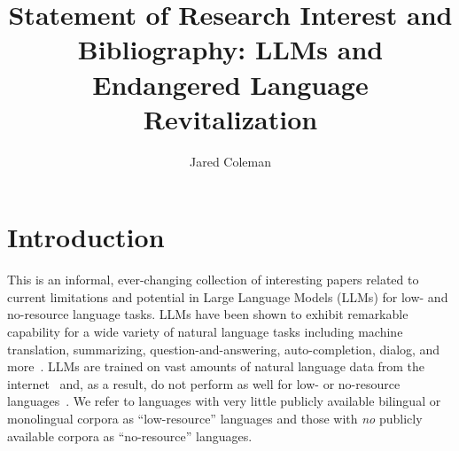 \documentclass{article}
\title{Statement of Research Interest and Bibliography: LLMs and Endangered Language Revitalization}
\author{Jared Coleman}
\date{}
\begin{document}
\maketitle



\section*{Introduction}
This is an informal, ever-changing collection of interesting papers related to current limitations and potential in Large Language Models (LLMs) for low- and no-resource language tasks.
LLMs have been shown to exhibit remarkable capability for a wide variety of natural language tasks including machine translation, summarizing, question-and-answering, auto-completion, dialog, and more~\cite{gpt:agi}.
LLMs are trained on vast amounts of natural language data from the internet~\cite{gpt:gpt4-tech-report} and, as a result, do not perform as well for low- or no-resource languages~\cite{palm,gpt:low-resource-translation}.
We refer to languages with very little publicly available bilingual or monolingual corpora as ``low-resource'' languages and those with \textit{no} publicly available corpora as ``no-resource'' languages.
\end{document}
